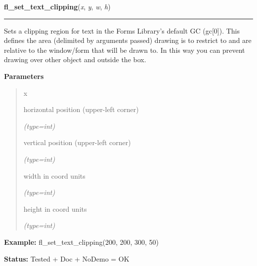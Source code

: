 \hspace{.8\funcindent}\begin{boxedminipage}{\funcwidth}

    \raggedright \textbf{fl\_set\_text\_clipping}(\textit{x}, \textit{y}, \textit{w}, \textit{h})

    \vspace{-1.5ex}

    \rule{\textwidth}{0.5\fboxrule}
\setlength{\parskip}{2ex}
    Sets a clipping region for text in the Forms Library's default GC 
    (gc[0]). This defines the area (delimited by arguments passed) drawing 
    is to restrict to and are relative to the window/form that will be 
    drawn to. In this way you can prevent drawing over other object and 
    outside the box.

\setlength{\parskip}{1ex}
      \textbf{Parameters}
      \vspace{-1ex}

      \begin{quote}
        \begin{Ventry}{x}

          \item[x]

          horizontal position (upper-left corner)

            {\it (type=int)}

          \item[y]

          vertical position (upper-left corner)

            {\it (type=int)}

          \item[w]

          width in coord units

            {\it (type=int)}

          \item[h]

          height in coord units

            {\it (type=int)}

        \end{Ventry}

      \end{quote}

\textbf{Example:} fl\_set\_text\_clipping(200, 200, 300, 50)



\textbf{Status:} Tested + Doc + NoDemo = OK



    \end{boxedminipage}

